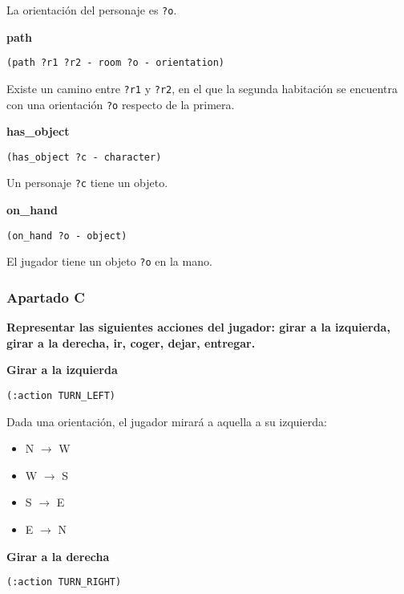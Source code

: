 \documentclass[11pt,a4paper]{article}
\begin{document}
La orientación del personaje es \texttt{?o}.

\medskip

\large{\textbf{path}}

\texttt{(path ?r1 ?r2 - room ?o - orientation)}

\smallskip

Existe un camino entre \texttt{?r1} y \texttt{?r2}, en el que la segunda habitación
se encuentra con una orientación \texttt{?o} respecto de la primera.

\medskip

\large{\textbf{has\_object}}

\texttt{(has\_object ?c - character)}

\smallskip

Un personaje \texttt{?c} tiene un objeto.

\medskip

\large{\textbf{on\_hand}}

\texttt{(on\_hand ?o - object)}

\smallskip

El jugador tiene un objeto \texttt{?o} en la mano.

\subsubsection{Apartado C}

\textbf{Representar las siguientes acciones del jugador: girar a la izquierda, girar a la derecha, ir, coger, dejar, entregar.}

\bigskip

\large{\textbf{Girar a la izquierda}}

\texttt{(:action TURN\_LEFT)}

\smallskip

Dada una orientación, el jugador mirará a aquella a su izquierda:

\begin{itemize}
\item N $\rightarrow$ W
\item W $\rightarrow$ S
\item S $\rightarrow$ E
\item E $\rightarrow$ N
\end{itemize}

\medskip

\large{\textbf{Girar a la derecha}}

\texttt{(:action TURN\_RIGHT)}

\smallskip
\end{document}
